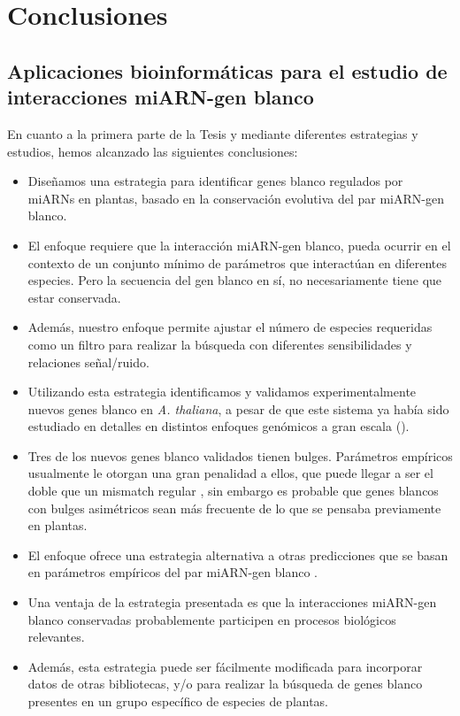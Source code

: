 \setcounter{chapter}{8}
\chapter*{Conclusiones} 
\setcounter{figure}{0}
\setcounter{table}{0}
\setcounter{section}{0}


\graphicspath{{Chapter2/Figs/}}


\section{Aplicaciones bioinformáticas para el estudio de interacciones miARN-gen blanco}

En cuanto a la primera parte de la Tesis y mediante diferentes estrategias y estudios, hemos alcanzado las siguientes conclusiones:

\begin{itemize}
    \item Diseñamos una estrategia para identificar genes blanco regulados por miARNs en plantas, basado en la conservación evolutiva del par miARN-gen blanco.
    \item El enfoque requiere que la interacción miARN-gen blanco, pueda ocurrir en el contexto de un conjunto mínimo de parámetros que interactúan en diferentes especies. Pero la secuencia del gen blanco en sí, no necesariamente tiene que estar conservada.
    \item Además, nuestro enfoque permite ajustar el número de especies requeridas como un filtro para realizar la búsqueda con diferentes sensibilidades y relaciones señal/ruido.
    \item Utilizando esta estrategia identificamos y validamos experimentalmente nuevos genes blanco en \textit{A. thaliana}, a pesar de que este sistema ya había sido estudiado en detalles en distintos enfoques genómicos a gran escala (\citep{Allen2005207,JonesRhoades2004787,Addo-quaye2009a,German2008,Rajagopalan2006,Schwab2005517}).
    \item Tres de los nuevos genes blanco validados tienen bulges. Parámetros empíricos usualmente le otorgan una gran penalidad a ellos, que puede llegar a ser el doble que un mismatch regular \citep{JonesRhoades2004787}, 
    sin embargo es probable que genes blancos con bulges asimétricos sean más frecuente de lo que se pensaba previamente en plantas.
    \item El enfoque ofrece una estrategia alternativa a otras predicciones que se basan en parámetros empíricos del par miARN-gen blanco \citep{Allen2005207,JonesRhoades2004787,citeulike:8816489,Fahlgren_chapter}.
    \item Una ventaja de la estrategia presentada es que la interacciones miARN-gen blanco conservadas probablemente participen en procesos biológicos relevantes.
    \item Además, esta estrategia puede ser fácilmente modificada para incorporar datos de otras bibliotecas, y/o para realizar la búsqueda de genes blanco presentes en un grupo específico de especies de plantas.
\end{itemize}


